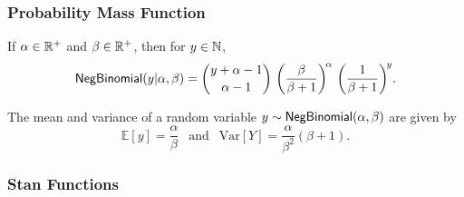 \subsubsection{Probability Mass Function}

If $\alpha \in \mathbb{R}^+$ and $\beta \in \mathbb{R}^+$, then for $y \in
\mathbb{N}$,
\[
\mbox{\sf NegBinomial}(y|\alpha,\beta)
 =
\binom{y + \alpha - 1}{\alpha - 1}
\,
\left( \frac{\beta}{\beta+1} \right)^{\!\alpha}
\,
\left( \frac{1}{\beta + 1} \right)^{\!y} \!.
\]


The mean and variance of a random variable $y \sim
\mbox{\sf NegBinomial}(\alpha,\beta)$ are given by
\[
\mathbb{E}[y] = \frac{\alpha}{\beta}
\ \ \mbox{ and } \ \
\mbox{Var}[Y] = \frac{\alpha}{\beta^2} (\beta + 1).
\]


\subsubsection{Stan Functions}

